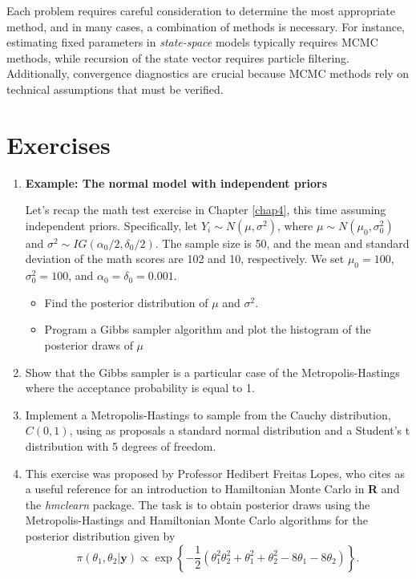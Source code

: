 Each problem requires careful consideration to determine the most appropriate method, and in many cases, a combination of methods is necessary. For instance, estimating fixed parameters in \textit{state-space} models typically requires MCMC methods, while recursion of the state vector requires particle filtering. Additionally, convergence diagnostics are crucial because MCMC methods rely on technical assumptions that must be verified.

\section{Exercises}\label{sec56}

\begin{enumerate}
	\item \textbf{Example: The normal model with independent priors}
	
	Let's recap the math test exercise in Chapter \ref{chap4}, this time assuming independent priors. Specifically, let $Y_i \sim N(\mu, \sigma^2)$, where $\mu \sim N(\mu_0, \sigma_0^2)$ and $\sigma^2 \sim IG(\alpha_0 / 2, \delta_0 / 2)$. The sample size is 50, and the mean and standard deviation of the math scores are 102 and 10, respectively. We set $\mu_0 = 100$, $\sigma_0^2 = 100$, and $\alpha_0 = \delta_0 = 0.001$.
	
	\begin{itemize}
		\item Find the posterior distribution of $\mu$ and $\sigma^2$.
		\item Program a Gibbs sampler algorithm and plot the histogram of the posterior draws of $\mu$
	\end{itemize}

	\item Show that the Gibbs sampler is a particular case of the Metropolis-Hastings where the acceptance probability is equal to 1.
	
	\item Implement a Metropolis-Hastings to sample from the Cauchy distribution, $C(0,1)$, using as proposals a standard normal distribution and a Student's t distribution with 5 degrees of freedom.
	
	\item This exercise was proposed by Professor Hedibert Freitas Lopes, who cites \cite{thomas2021learning} as a useful reference for an introduction to Hamiltonian Monte Carlo in \textbf{R} and the \textit{hmclearn} package. The task is to obtain posterior draws using the Metropolis-Hastings and Hamiltonian Monte Carlo algorithms for the posterior distribution given by 
	\[
	\pi(\theta_1,\theta_2|\bm{y}) \propto \exp\left\{-\frac{1}{2}(\theta_1^2\theta_2^2 + \theta_1^2 + \theta_2^2 - 8\theta_1 - 8\theta_2)\right\}.
	\]
	

\end{enumerate}

